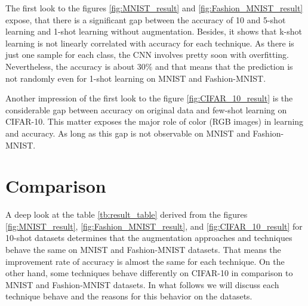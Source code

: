 The first look to the figures \ref{fig:MNIST_result} and \ref{fig:Fashion_MNIST_result} expose, that there is
a significant gap between the accuracy of 10 and 5-shot learning and 1-shot learning without augmentation. Besides,
it shows that k-shot learning is not linearly correlated with accuracy for each technique. As there is
just one sample for each class, the CNN involves pretty soon with overfitting. Nevertheless, the
accuracy is about $30\%$ and that means that the prediction is not randomly even for 1-shot
learning on MNIST and Fashion-MNIST.

Another impression of the first look to the figure \ref{fig:CIFAR_10_result} is the considerable gap
between accuracy on original data and few-shot learning on CIFAR-10. This matter exposes the major
role of color (RGB images) in learning and accuracy. As long as this gap is not observable on MNIST
and Fashion-MNIST.

\section{Comparison}

A deep look at the table \ref{tb:result_table} derived from the figures \ref{fig:MNIST_result}, \ref{fig:Fashion_MNIST_result}, and
\ref{fig:CIFAR_10_result} for 10-shot datasets determines that the augmentation approaches and techniques behave the same on MNIST and Fashion-MNIST datasets. That means the improvement rate of accuracy is almost the same for each technique. On the other hand, some techniques behave differently on CIFAR-10 in comparison to MNIST and Fashion-MNIST datasets. In what follows we will discuss each technique behave and the reasons for this behavior on the datasets.

